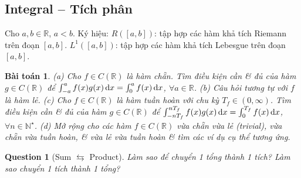 \documentclass{article}
\newtheorem{baitoan}{Bài toán}
\newtheorem{question}{Question}
\begin{document}

\subsection{Integral -- Tích phân}
Cho $a,b\in\mathbb{R}$, $a < b$. Ký hiệu: $R([a,b])$: tập hợp các hàm khả tích Riemann trên đoạn $[a,b]$. $L^1([a,b])$: tập hợp các hàm khả tích Lebesgue trên đoạn $[a,b]$.

\begin{baitoan}
	(a) Cho $f\in C(\mathbb{R})$ là hàm chẵn. Tìm điều kiện cần \& đủ của hàm $g\in C(\mathbb{R})$ để $\int_{-a}^a f(x)g(x)\,{\rm d}x = \int_0^a f(x)\,{\rm d}x$, $\forall a\in\mathbb{R}$. (b) Câu hỏi tương tự với $f$ là hàm lẻ. (c) Cho $f\in C(\mathbb{R})$ là hàm tuần hoàn với chu kỳ $T_f\in(0,\infty)$. Tìm điều kiện cần \& đủ của hàm $g\in C(\mathbb{R})$ để  $\int_{-nT_f}^{nT_f} f(x)g(x)\,{\rm d}x = \int_0^{T_f} f(x)\,{\rm d}x$, $\forall n\in\mathbb{N}^\star$. (d) Mở rộng cho các hàm $f\in C(\mathbb{R})$ vừa chẵn vừa lẻ (trivial), vừa chẵn vừa tuần hoàn, \& vừa lẻ vừa tuần hoàn \& tìm các ví dụ cụ thể tương ứng.
\end{baitoan}

\begin{question}[Sum $\leftrightarrows$ Product]
	Làm sao để chuyển 1 tổng thành 1 tích? Làm sao chuyển 1 tích thành 1 tổng?
\end{question}
\end{document}
